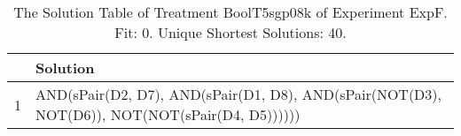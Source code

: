 \begin{table}[ht]
\centering
\begin{tabular}{rp{9cm}}
  \hline
 & Solution \\ 
  \hline
1 & AND(sPair(D2, D7), AND(sPair(D1, D8), AND(sPair(NOT(D3), NOT(D6)), NOT(NOT(sPair(D4, D5)))))) \\ 
   \hline
\end{tabular}
\caption{The Solution Table of Treatment BoolT5sgp08k of Experiment ExpF. Fit: 0. Unique Shortest Solutions: 40.} 
\end{table}

